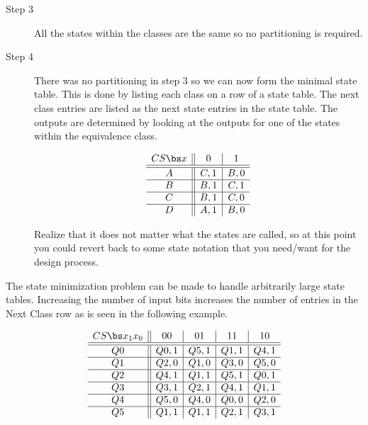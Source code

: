 \begin{description}
    \item[Step 3]
        All the states within the classes are the same so no
        partitioning is required.

    \item[Step 4]
        There was no partitioning in step 3 so we can now form the minimal
        state table.  This is done by listing each class on a row of a
        state table.  The next class entries are listed as the next state
        entries in the state table.  The outputs are determined by looking
        at the outputs for one of the states within the equivalence class.

        $$
        \begin{array} {c||c|c}
            CS \bs x & 0     & 1    \\ \hline \hline
            A       & C,1  & B,0 \\ \hline
            B       & B,1  & C,1 \\ \hline
            C       & B,1  & C,0 \\ \hline
            D       & A,1  & B,0 \\
        \end{array} $$

        Realize that it does not matter what the states are
        called, so at this point you could revert back to some state notation
        that you need/want for the design process.
\end{description}

The state minimization problem can be made to handle arbitrarily
large state tables.  Increasing the number of input bits increases the
number of entries in the  Next Class row as is seen in the following example.

$$
\begin{array} {c||c|c|c|c}
    CS \bs x_1 x_0 & 00    & 01   & 11    & 10   \\ \hline \hline
    Q0       & Q0,1  & Q5,1 & Q1,1  & Q4,1 \\ \hline
    Q1       & Q2,0  & Q1,0 & Q3,0  & Q5,0 \\ \hline
    Q2       & Q4,1  & Q1,1 & Q5,1  & Q0,1 \\ \hline
    Q3       & Q3,1  & Q2,1 & Q4,1  & Q1,1 \\ \hline
    Q4       & Q5,0  & Q4,0 & Q0,0  & Q2,0 \\ \hline
    Q5       & Q1,1  & Q1,1 & Q2,1  & Q3,1 \\
\end{array} $$

